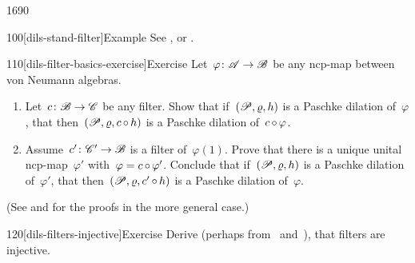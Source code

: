 \begin{parsec}{1690}
\begin{point}{100}[dils-stand-filter]{Example}
    See , 
        or \cite[prop.~6]{westerbaan2016universal}.
\end{point}
\begin{point}{110}[dils-filter-basics-exercise]{Exercise}%
Let~$\varphi\colon \mathscr{A} \to \mathscr{B}$ be any ncp-map
    between von Neumann algebras.
\begin{enumerate}
\item
    Let~$c \colon \mathscr{B} \to \mathscr{C}$ be any filter.
    Show that if~$(\mathscr{P}, \varrho, h)$ is a Paschke dilation
            of~$\varphi$,
    that then~$(\mathscr{P}, \varrho, c \mathop{\circ} h)$ is a Paschke dilation
        of~$c \mathop{\circ} \varphi$.
\item
    Assume~$c'\colon \mathscr{C}' \to \mathscr{B}$ is a filter of~$\varphi(1)$.
    Prove that there is a unique unital ncp-map~$\varphi'$
        with~$\varphi = c \mathop{\circ} \varphi'$.
    Conclude that if~$(\mathscr{P}, \varrho, h)$ is a Paschke dilation
            of~$\varphi'$,
            that then~$(\mathscr{P}, \varrho, c' \mathop{\circ} h)$
            is a Paschke dilation of~$\varphi$.
\end{enumerate}
(See  and  for the proofs
        in the more general case.)
\end{point}
\begin{point}{120}[dils-filters-injective]{Exercise}%
Derive (perhaps from~ and~),
    that filters are injective.
\end{point}
\end{parsec}
